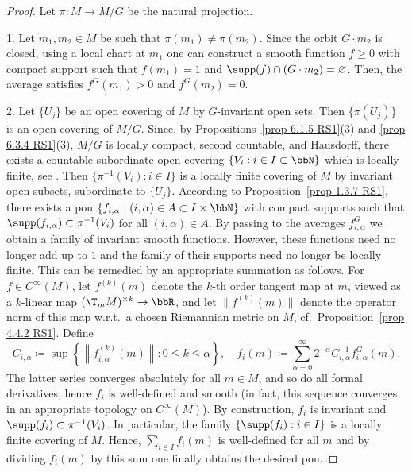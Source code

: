 \begin{proof}
    Let $\pi: M\to M\slash G$ be the natural projection.

    1. Let $m_1,m_2\in M$ be such that $\pi(m_1)\neq \pi(m_2)$. Since the orbit $G\cdot m_2$ is closed, using a local chart at $m_1$ one can construct a smooth function $f\geq 0$ with compact support such that $f(m_1)=1$ and $\supp(f)\cap (G\cdot m_2)=\varnothing$. Then, the average satisfies $f^G(m_1)>0$ and $f^G(m_2)=0$.

    2. Let $\{U_j\}$ be an open covering of $M$ by $G$-invariant open sets. Then $\{\pi(U_j)\}$ is an open covering of $M\slash G$. Since, by Propositions~\ref{prop 6.1.5 RS1}(3) and \ref{prop 6.3.4 RS1}(3), $M\slash G$ is locally compact, second countable, and Hausdorff, there exists a countable subordinate open covering $\{V_i:i\in I\subset \bbN\}$ which is locally finite, see \cite[Lem.~1.9]{Warner}. Then $\{\pi^{-1}(V_i):i\in I\}$ is a locally finite covering of $M$ by invariant open subsets, subordinate to $\{U_j\}$. According to Proposition~\ref{prop 1.3.7 RS1}, there exists a \gls{pou} $\{f_{i,\alpha}:(i,\alpha)\in A\subset I\times\bbN\}$ with compact supports such that $\supp(f_{i,\alpha})\subset \pi^{-1}(V_i)$ for all $(i,\alpha)\in A$. By passing to the averages $f_{i,\alpha}^G$ we obtain a family of invariant smooth functions. However, these functions need no longer add up to $1$ and the family of their supports need no longer be locally finite. This can be remedied by an appropriate summation as follows. For $f\in C^\infty(M)$, let $f^{(k)}(m)$ denote the $k$-th order tangent map at $m$, viewed as a $k$-linear map $(\T_m M)^{\times k}\to \bbR$, and let $\lVert f^{(k)}(m)\rVert$ denote the operator norm of this map w.r.t.\ a chosen Riemannian metric on $M$, cf.\ Proposition~\ref{prop 4.4.2 RS1}. Define 
    \[C_{i,\alpha}\coloneqq \sup\left\{\left\lVert f_{i,\alpha}^{(k)}(m)\right\rVert:0\leq k\leq \alpha\right\},\quad f_i(m)\coloneqq \sum_{\alpha=0}^\infty 2^{-\alpha}C_{i,\alpha}^{-1}f_{i,\alpha}^G(m).\]
    The latter series converges absolutely for all $m\in M$, and so do all formal derivatives, hence $f_i$ is well-defined and smooth (in fact, this sequence converges in an appropriate topology on $C^\infty(M)$). By construction, $f_i$ is invariant and $\supp(f_i)\subset\pi^{-1}(V_i)$. In particular, the family $\{\supp(f_i):i\in I\}$ is a locally finite covering of $M$. Hence, $\sum_{i\in I}f_i(m)$ is well-defined for all $m$ and by dividing $f_i(m)$ by this sum one finally obtains the desired \gls{pou}.


\end{proof}
